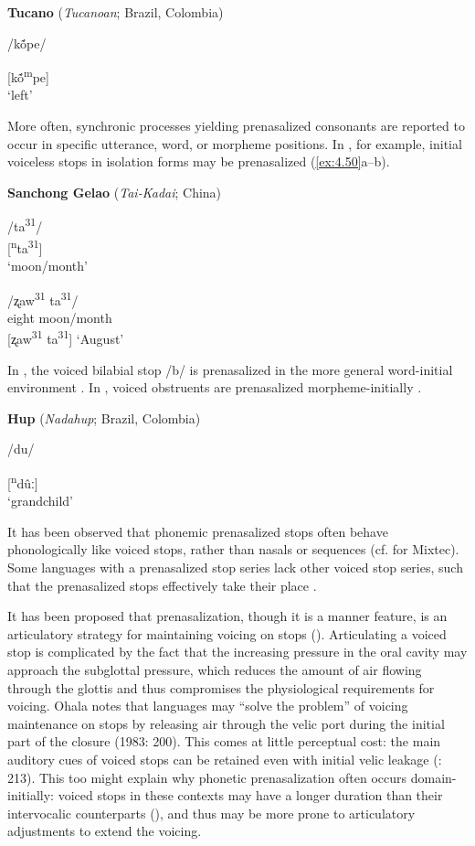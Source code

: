 \ea\label{ex:4.49}
  \textbf{Tucano} (\textit{Tucanoan}; Brazil, Colombia)

/kṍpe/

[kṍ\textsuperscript{m}pe]\\
\glt ‘left’
\citep[11]{West1980}
\z

  More often, synchronic processes yielding prenasalized consonants are reported to occur in specific utterance, word, or morpheme positions. In , for example, initial voiceless stops in isolation forms may be prenasalized (\ref{ex:4.50}a--b).

\ea\label{ex:4.50}
  \textbf{Sanchong Gelao} (\textit{Tai-Kadai}; China)

\ea  /ta\textsuperscript{31}/\\{}
  [\textsuperscript{n}ta\textsuperscript{31}]\\
\glt  ‘moon/month’

\ex  /ʐaw\textsuperscript{31}   ta\textsuperscript{31}/\\
  eight   moon/month\\{}
  [ʐaw\textsuperscript{31} ta\textsuperscript{31}]
\glt  ‘August’
\citep[40]{Shen2003}
\z
\z

  In , the voiced bilabial stop /b/ is prenasalized in the more general word-initial environment \citep{Fedden2007}. In , voiced obstruents are prenasalized morpheme-initially .

\ea\label{ex:4.51}
  \textbf{Hup} (\textit{Nadahup}; Brazil, Colombia)

/du/

[\textsuperscript{n}dûː]\\
\glt ‘grandchild’
\citep[54]{Epps2008}
\z

  It has been observed that phonemic prenasalized stops often behave phonologically like voiced stops, rather than nasals or sequences (cf. \citealt{IversonSalmons1996} for Mixtec). Some languages with a prenasalized stop series lack other voiced stop series, such that the prenasalized stops effectively take their place \citep[67-68]{Maddieson1984}.

  It has been proposed that prenasalization, though it is a manner feature, is an articulatory strategy for maintaining voicing on stops (\citealt{Ohala1983,HentonEtAl1992}). Articulating a voiced stop is complicated by the fact that the increasing pressure in the oral cavity may approach the subglottal pressure, which reduces the amount of air flowing through the glottis and thus compromises the physiological requirements for voicing. Ohala notes that languages may “solve the problem” of voicing maintenance on stops by releasing air through the velic port during the initial part of the closure (1983: 200). This comes at little perceptual cost: the main auditory cues of voiced stops can be retained even with initial velic leakage (\citealt{OhalaOhala1991}: 213). This too might explain why phonetic prenasalization often occurs domain-initially: voiced stops in these contexts may have a longer duration than their intervocalic counterparts (\citealt{FlegeBrown1982}), and thus may be more prone to articulatory adjustments to extend the voicing.

